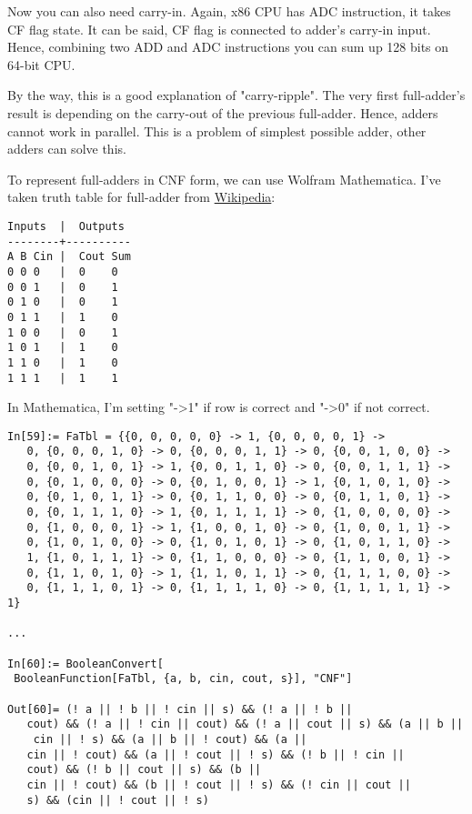 Now you can also need carry-in.
Again, x86 CPU has ADC instruction, it takes CF flag state.
It can be said, CF flag is connected to adder's carry-in input.
Hence, combining two ADD and ADC instructions you can sum up 128 bits on 64-bit CPU.

By the way, this is a good explanation of "carry-ripple".
The very first full-adder's result is depending on the carry-out of the previous full-adder.
Hence, adders cannot work in parallel.
This is a problem of simplest possible adder, other adders can solve this.

To represent full-adders in CNF form, we can use Wolfram Mathematica.
I've taken truth table for full-adder from \href{https://en.wikipedia.org/wiki/Adder_(electronics)}{Wikipedia}:

\begin{lstlisting}
Inputs 	|  Outputs
--------+----------
A B Cin |  Cout Sum
0 0 0   |  0    0
0 0 1   |  0    1
0 1 0   |  0    1
0 1 1   |  1    0
1 0 0   |  0    1
1 0 1   |  1    0
1 1 0   |  1    0
1 1 1   |  1    1
\end{lstlisting}

In Mathematica, I'm setting "->1" if row is correct and "->0" if not correct.

\begin{lstlisting}
In[59]:= FaTbl = {{0, 0, 0, 0, 0} -> 1, {0, 0, 0, 0, 1} -> 
   0, {0, 0, 0, 1, 0} -> 0, {0, 0, 0, 1, 1} -> 0, {0, 0, 1, 0, 0} -> 
   0, {0, 0, 1, 0, 1} -> 1, {0, 0, 1, 1, 0} -> 0, {0, 0, 1, 1, 1} -> 
   0, {0, 1, 0, 0, 0} -> 0, {0, 1, 0, 0, 1} -> 1, {0, 1, 0, 1, 0} -> 
   0, {0, 1, 0, 1, 1} -> 0, {0, 1, 1, 0, 0} -> 0, {0, 1, 1, 0, 1} -> 
   0, {0, 1, 1, 1, 0} -> 1, {0, 1, 1, 1, 1} -> 0, {1, 0, 0, 0, 0} -> 
   0, {1, 0, 0, 0, 1} -> 1, {1, 0, 0, 1, 0} -> 0, {1, 0, 0, 1, 1} -> 
   0, {1, 0, 1, 0, 0} -> 0, {1, 0, 1, 0, 1} -> 0, {1, 0, 1, 1, 0} -> 
   1, {1, 0, 1, 1, 1} -> 0, {1, 1, 0, 0, 0} -> 0, {1, 1, 0, 0, 1} -> 
   0, {1, 1, 0, 1, 0} -> 1, {1, 1, 0, 1, 1} -> 0, {1, 1, 1, 0, 0} -> 
   0, {1, 1, 1, 0, 1} -> 0, {1, 1, 1, 1, 0} -> 0, {1, 1, 1, 1, 1} -> 1}

...

In[60]:= BooleanConvert[
 BooleanFunction[FaTbl, {a, b, cin, cout, s}], "CNF"]

Out[60]= (! a || ! b || ! cin || s) && (! a || ! b || 
   cout) && (! a || ! cin || cout) && (! a || cout || s) && (a || b ||
    cin || ! s) && (a || b || ! cout) && (a || 
   cin || ! cout) && (a || ! cout || ! s) && (! b || ! cin || 
   cout) && (! b || cout || s) && (b || 
   cin || ! cout) && (b || ! cout || ! s) && (! cin || cout || 
   s) && (cin || ! cout || ! s)
\end{lstlisting}

